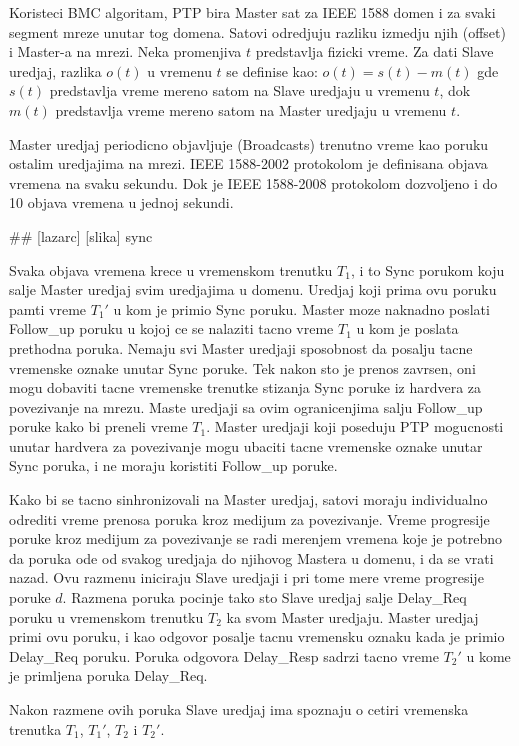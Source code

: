 \documentclass[a4paper,12pt, master]{etf}
\begin{document}
	Koristeci BMC algoritam, PTP bira Master sat za IEEE 1588 domen i za svaki segment mreze 
	unutar tog domena.
	Satovi odredjuju razliku izmedju njih (offset) i Master-a na mrezi. Neka promenjiva $t$
	predstavlja fizicki vreme. Za dati Slave uredjaj, razlika $o(t)$ u vremenu $t$ se definise 
	kao:
	$o(t) = s(t) - m(t)$
	gde $s(t)$ predstavlja vreme mereno satom na Slave uredjaju u vremenu $t$, dok $m(t)$
	predstavlja vreme mereno satom na Master uredjaju u vremenu $t$.

	Master uredjaj periodicno objavljuje (Broadcasts) trenutno vreme kao poruku ostalim 
	uredjajima na mrezi. IEEE 1588-2002 protokolom je definisana objava vremena na svaku 
	sekundu. Dok je IEEE 1588-2008 protokolom dozvoljeno i do 10 objava vremena u jednoj 
	sekundi.

	\#\# [lazarc] [slika] sync

	Svaka objava vremena krece u vremenskom trenutku $T_1$, i to Sync porukom koju salje Master
	uredjaj svim uredjajima u domenu. Uredjaj koji prima ovu poruku pamti vreme $T_1'$ u kom je
	primio Sync poruku. Master moze naknadno poslati Follow\_up poruku u kojoj ce se nalaziti 
	tacno vreme $T_1$ u kom je poslata prethodna poruka. Nemaju svi Master uredjaji sposobnost 
	da posalju tacne vremenske oznake unutar Sync poruke. Tek nakon sto je prenos zavrsen, oni 
	mogu dobaviti tacne vremenske trenutke stizanja Sync poruke iz hardvera za povezivanje na 
	mrezu. Maste uredjaji sa ovim ogranicenjima salju Follow\_up poruke kako bi preneli vreme 
	$T_1$. Master uredjaji koji poseduju PTP mogucnosti unutar hardvera za povezivanje mogu 
	ubaciti tacne vremenske oznake unutar Sync poruka, i ne moraju koristiti Follow\_up poruke.

	Kako bi se tacno sinhronizovali na Master uredjaj, satovi moraju individualno odrediti 
	vreme prenosa poruka kroz medijum za povezivanje. Vreme progresije poruke kroz medijum za 
	povezivanje	se radi merenjem vremena koje je potrebno da poruka ode od svakog uredjaja do 
	njihovog Mastera u domenu, i da se vrati nazad. Ovu razmenu iniciraju Slave uredjaji i pri 
	tome mere vreme	progresije poruke $d$. Razmena poruka pocinje tako sto Slave uredjaj salje 
	Delay\_Req poruku u	vremenskom trenutku $T_2$ ka svom Master uredjaju. Master uredjaj 
	primi ovu poruku, i kao	odgovor posalje tacnu vremensku oznaku kada je primio Delay\_Req 
	poruku. Poruka odgovora	Delay\_Resp sadrzi tacno vreme $T_2'$ u kome je primljena poruka 
	Delay\_Req.

	Nakon razmene ovih poruka Slave uredjaj ima spoznaju o cetiri vremenska trenutka $T_1$, 
	$T_1'$,	$T_2$ i $T_2'$.
\end{document}
